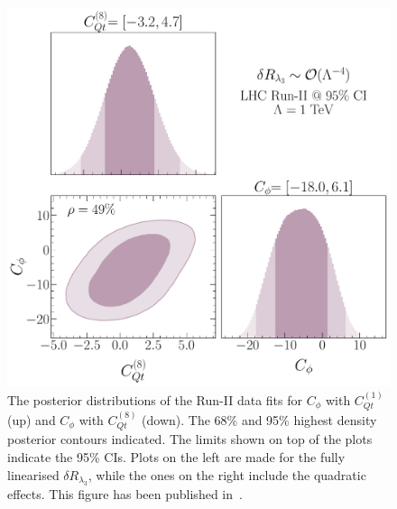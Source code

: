 \begin{figure}[h!]
\begin{center}
		\includegraphics[width=0.45\linewidth]{fig/Cqt8_LHC_RunII_quadl3_rge} 
	\end{center}
\caption{The posterior distributions of the Run-II data fits for $C_\phi$ with $C_{Qt}^{(1)}$ (up) and $C_\phi$ with $C_{Qt}^{(8)}$ (down). The 68\% and 95\% highest density posterior contours indicated. The limits shown on top of the plots indicate the 95\% CIs. Plots on the left are made for the fully linearised  $\delta R_{\lambda_3}$, while the ones on the right include the quadratic effects. This figure has been published in~\cite{Alasfar:2022zyr}. \label{2param-cqt}   }
\end{figure}

